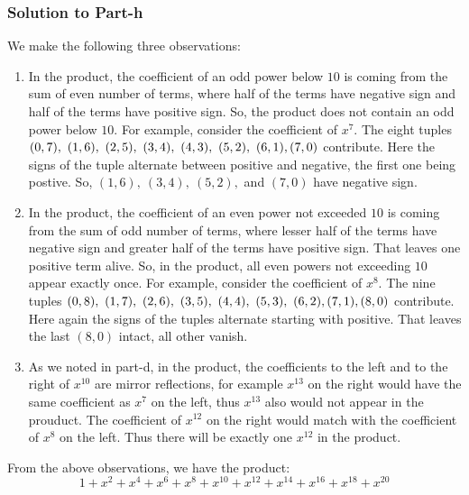 \documentclass[12pt]{article}
\begin{document}
\subsubsection*{Solution to Part-h}
We make the following three observations:
\begin{enumerate}
\item In the product, the coefficient of an odd power below $10$ is coming from the sum of even number of terms, where half of the terms have negative sign and half of the terms have positive sign. So, the product does not contain an odd power below $10$. For example, consider the coefficient of $x^7$. The eight tuples $(0, 7),\ (1,6),\ (2,5),\ (3,4),\ (4,3),\ (5,2),\ (6,1),\ \\ (7,0)$ contribute. Here the signs of the tuple alternate between positive and negative, the first one being postive. So, $(1,6),\ (3,4),\ (5,2),$ and $(7,0)$ have negative sign.
\item In the product, the coefficient of an even power not exceeded $10$ is coming from the sum of odd number of terms, where lesser half of the terms have negative sign and greater half of the terms have positive sign. That leaves one positive term alive. So, in the product, all even powers not exceeding $10$ appear exactly once. For example, consider the coefficient of $x^8$. The nine tuples $(0,8),\ (1,7),\ (2,6),\ (3,5),\ (4,4),\ (5,3),\ (6,2),\\(7,1),(8,0)$ contribute. Here again the signs of the tuples alternate starting with positive. That leaves the last $(8,0)$ intact, all other vanish.
\item As we noted in part-d, in the product, the coefficients to the left and to the right of $x^{10}$ are mirror reflections, for example $x^{13}$ on the right would have the same coefficient as $x^7$ on the left, thus $x^{13}$ also would not appear in the prouduct. The coefficient of $x^{12}$ on the right would match with the coefficient of $x^{8}$ on the left. Thus there will be exactly one $x^{12}$ in the product. 
\end{enumerate}
From the above observations, we have the product:
\[
1 + x^2 + x^4 + x^6 + x^8 + x^{10} + x^{12} + x^{14} + x^{16} + x^{18} + x^{20}
\]
\end{document}
